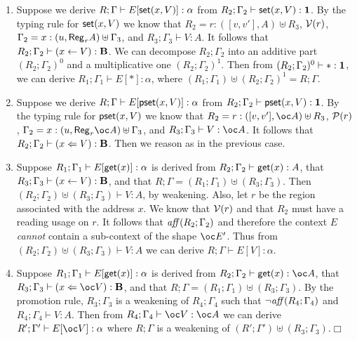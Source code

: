 \documentclass[11pt]{article}
\newcommand{\qed}{\hfill${\Box}$}
\newcommand{\Gives}{\vdash}             \newcommand{\IGives}{\vdash_{I}}        \newcommand{\AIGives}{\vdash_{{\it AI}}} \newcommand{\CGives}{\vdash_{C}}
\newcommand{\hyp}[3]{#1:(#2, #3)}
\newcommand{\behtype}{{\bf B}}
\newcommand{\csum}{\uplus}              \newcommand{\dpar}{\mid\!\mid}
\newcommand{\pst}[2]{{\sf pset}(#1,#2)}
\newcommand{\st}[2]{{\sf set}(#1,#2)}
\newcommand{\rgtype}[2]{{\it {\sf Reg}_{#1} #2}}
\newcommand{\get}[1]{{\sf get}(#1)}
\newcommand{\store}[2]{(#1 \leftarrow #2)}
\newcommand{\pstore}[2]{(#1 \Leftarrow #2)}
\newcommand{\upair}[2]{[#1,#2]}
\newcommand{\vlt}[1]{{\cal V}(#1)}
\newcommand{\prs}[1]{{\cal P}(#1)}
\begin{document}
\begin{enumerate}


\item Suppose we derive $R;\Gamma \Gives E[\st{x}{V}]:\alpha$ from
$R_2;\Gamma_2 \Gives \st{x}{V}:\tertype$.
By the typing rule for $\st{x}{V}$ we know that 
$R_2= \hyp{r}{\upair{v}{v'}}{A} \csum R_3$, $\vlt{r}$,
$\Gamma_2 = \hyp{x}{u}{\rgtype{r}{A}} \csum \Gamma_3$, and
$R_3;\Gamma_3 \Gives V:A$.
It follows that $R_2;\Gamma_2 \Gives \store{x}{V}:\behtype$.
We can decompose $R_2;\Gamma_2$ into an additive part 
$(R_{2};\Gamma_2)^{0}$ and a multiplicative one 
$(R_{2};\Gamma_2)^{1}$.
Then from $(R_{2};\Gamma_{2})^{0} \Gives *:\tertype$,
we can derive $R_1;\Gamma_1\Gives E[*]:\alpha$, where
$(R_1;\Gamma_1) \csum (R_2;\Gamma_2)^{1} = R;\Gamma$.


\item Suppose we derive $R;\Gamma \Gives E[\pst{x}{V}]:\alpha$ from
$R_2;\Gamma_2 \Gives \pst{x}{V}:\tertype$.
By the typing rule for $\pst{x}{V}$ we know that 
$R_2= \hyp{r}{\upair{v}{v'}}{\bang A} \csum R_3$, $\prs{r}$,
$\Gamma_2 = \hyp{x}{u}{\rgtype{r}{\bang A}} \csum \Gamma_3$, and
$R_3;\Gamma_3 \Gives V:\bang A$.
It follows that $R_2;\Gamma_2 \Gives \pstore{x}{V}:\behtype$.
Then we reason as in the previous case.


\item Suppose $R_1;\Gamma_1 \Gives E[\get{x}]:\alpha$ is derived from
$R_2;\Gamma_2 \Gives \get{x}:A$, that $R_3;\Gamma_3 \Gives \store{x}{V}:\behtype$,
and that $R;\Gamma = (R_1;\Gamma_1) \csum (R_3;\Gamma_3)$.
Then $(R_2;\Gamma_2) \csum (R_3;\Gamma_3) \Gives V: A$, by weakening.
Also, let $r$ be the region associated with the address $x$. We know
that $\vlt{r}$ and that $R_2$ must have a reading usage on $r$.
It follows that ${\it aff}(R_2;\Gamma_2)$ and therefore the context
$E$ {\em cannot} contain a sub-context of the shape $\bang E'$. 
Thus from   $(R_2;\Gamma_2) \csum (R_3;\Gamma_3) \Gives V: A$ we
can derive $R;\Gamma \Gives E[V]:\alpha$.

\item  Suppose $R_1;\Gamma_1 \Gives E[\get{x}]:\alpha$ is derived from
$R_2;\Gamma_2 \Gives \get{x}:\bang A$, 
that $R_3;\Gamma_3 \Gives \pstore{x}{\bang V}:\behtype$,
and that $R;\Gamma = (R_1;\Gamma_1) \csum (R_3;\Gamma_3)$.
By the promotion rule, $R_3;\Gamma_3$ is a weakening of 
$R_4;\Gamma_4$ such that $\neg {\it aff}(R_4;\Gamma_4)$ and 
$R_4;\Gamma_4\Gives V: A$. 
Then from $R_4;\Gamma_4 \Gives \bang V:\bang A$ we can derive
$R';\Gamma' \Gives E[\bang V]:\alpha$ where $R;\Gamma$ is a
weakening of 
$(R';\Gamma')\csum (R_3;\Gamma_3)$.\qed

\end{enumerate}
\end{document}
